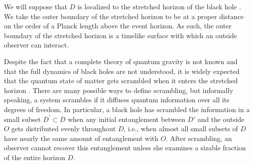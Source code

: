 \documentclass[a4paper,11pt]{article}
\theoremstyle{definition}
\begin{document}
We will suppose that $D$ is localized to the stretched horizon of the black hole \cite{Susskind:1993if}.
We take the outer boundary of the stretched horizon to be at a proper distance on the order of a Planck length above the event horizon.
As such, the outer boundary of the stretched horizon is a timelike surface with which an outside observer can interact.

Despite the fact that a complete theory of quantum gravity is not known and that the full dynamics of black holes are not understood, it is widely expected that the quantum state of matter gets scrambled when it enters the stretched horizon \cite{Hayden:2007cs, Sekino:2008he, Lashkari:2011yi}. There are many possible ways to define scrambling, but informally speaking, a system scrambles if it diffuses quantum information over all its degrees of freedom. In particular, a black hole has scrambled the information in a small subset $D^\prime \subset D$ when any initial entanglement between $D'$ and the outside $O$ gets distributed evenly throughout $D$, i.e., when almost all small subsets of $D$ have nearly the same amount of entanglement with $O$. After scrambling, an observer cannot recover this entanglement unless she examines a sizable fraction of the entire horizon $D$. 
 
\end{document}
